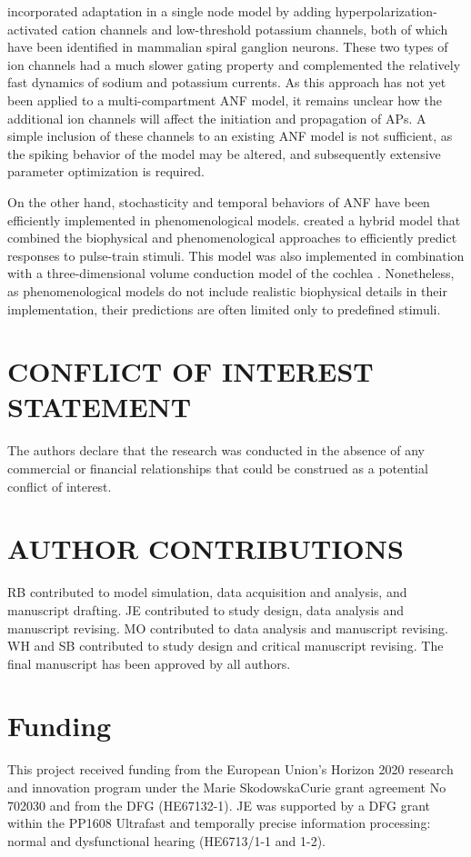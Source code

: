 \documentclass[utf8]{frontiersSCNS} %
\begin{document}
\cite{Negm2014} incorporated adaptation in a single node model by adding hyperpolarization-activated cation channels and low-threshold potassium channels, both of which have been identified in mammalian spiral ganglion neurons. These two types of ion channels had a much slower gating property and complemented the relatively fast dynamics of sodium and potassium currents. As this approach has not yet been applied to a multi-compartment ANF model, it remains unclear how the additional ion channels will affect the initiation and propagation of APs. A simple inclusion of these channels to an existing ANF model is not sufficient, as the spiking behavior of the model may be altered, and subsequently extensive parameter optimization is required.

On the other hand, stochasticity and temporal behaviors of ANF have been efficiently implemented in phenomenological models. \cite{VanGendt2016} created a hybrid model that combined the biophysical and phenomenological approaches to efficiently predict responses to pulse-train stimuli. This model was also implemented in combination with a three-dimensional volume conduction model of the cochlea \citep{VanGendt2016,VanGendt2017}. Nonetheless, as phenomenological models do not include realistic biophysical details in their implementation, their predictions are often limited only to predefined stimuli.



\section{CONFLICT OF INTEREST STATEMENT}
The authors declare that the research was conducted in the absence of any commercial or financial relationships that could be construed as a potential conflict of interest.

\section{AUTHOR CONTRIBUTIONS}
RB contributed to model simulation, data acquisition and analysis, and manuscript drafting. JE contributed to study design, data analysis and manuscript revising. MO contributed to data analysis and manuscript revising. WH and SB contributed to study design and critical manuscript revising. The final manuscript has been approved by all authors.

\section{Funding}
This project received funding from the European Union’s Horizon 2020 research and innovation program under the Marie SkodowskaCurie grant agreement No 702030 and from the DFG (HE67132-1). JE was supported by a DFG grant within the PP1608 Ultrafast and temporally precise information processing: normal and dysfunctional hearing (HE6713/1-1 and 1-2).
\end{document}
